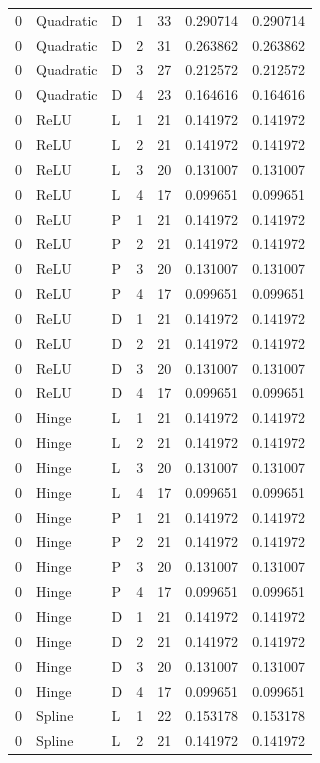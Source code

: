 \begin{longtable}{lllrrrr}
0 & Quadratic & D & 1 & 33 & 0.290714 & 0.290714 \\
0 & Quadratic & D & 2 & 31 & 0.263862 & 0.263862 \\
0 & Quadratic & D & 3 & 27 & 0.212572 & 0.212572 \\
0 & Quadratic & D & 4 & 23 & 0.164616 & 0.164616 \\
0 & ReLU & L & 1 & 21 & 0.141972 & 0.141972 \\
0 & ReLU & L & 2 & 21 & 0.141972 & 0.141972 \\
0 & ReLU & L & 3 & 20 & 0.131007 & 0.131007 \\
0 & ReLU & L & 4 & 17 & 0.099651 & 0.099651 \\
0 & ReLU & P & 1 & 21 & 0.141972 & 0.141972 \\
0 & ReLU & P & 2 & 21 & 0.141972 & 0.141972 \\
0 & ReLU & P & 3 & 20 & 0.131007 & 0.131007 \\
0 & ReLU & P & 4 & 17 & 0.099651 & 0.099651 \\
0 & ReLU & D & 1 & 21 & 0.141972 & 0.141972 \\
0 & ReLU & D & 2 & 21 & 0.141972 & 0.141972 \\
0 & ReLU & D & 3 & 20 & 0.131007 & 0.131007 \\
0 & ReLU & D & 4 & 17 & 0.099651 & 0.099651 \\
0 & Hinge & L & 1 & 21 & 0.141972 & 0.141972 \\
0 & Hinge & L & 2 & 21 & 0.141972 & 0.141972 \\
0 & Hinge & L & 3 & 20 & 0.131007 & 0.131007 \\
0 & Hinge & L & 4 & 17 & 0.099651 & 0.099651 \\
0 & Hinge & P & 1 & 21 & 0.141972 & 0.141972 \\
0 & Hinge & P & 2 & 21 & 0.141972 & 0.141972 \\
0 & Hinge & P & 3 & 20 & 0.131007 & 0.131007 \\
0 & Hinge & P & 4 & 17 & 0.099651 & 0.099651 \\
0 & Hinge & D & 1 & 21 & 0.141972 & 0.141972 \\
0 & Hinge & D & 2 & 21 & 0.141972 & 0.141972 \\
0 & Hinge & D & 3 & 20 & 0.131007 & 0.131007 \\
0 & Hinge & D & 4 & 17 & 0.099651 & 0.099651 \\
0 & Spline & L & 1 & 22 & 0.153178 & 0.153178 \\
0 & Spline & L & 2 & 21 & 0.141972 & 0.141972 \\

\end{longtable}
